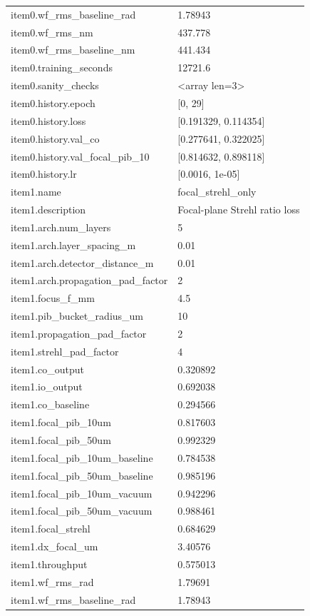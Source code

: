\begin{longtable}{p{}p{}}
item0.wf\_rms\_baseline\_rad & 1.78943\\
item0.wf\_rms\_nm & 437.778\\
item0.wf\_rms\_baseline\_nm & 441.434\\
item0.training\_seconds & 12721.6\\
item0.sanity\_checks & <array len=3>\\
item0.history.epoch & [0, 29]\\
item0.history.loss & [0.191329, 0.114354]\\
item0.history.val\_co & [0.277641, 0.322025]\\
item0.history.val\_focal\_pib\_10 & [0.814632, 0.898118]\\
item0.history.lr & [0.0016, 1e-05]\\
item1.name & focal\_strehl\_only\\
item1.description & Focal-plane Strehl ratio loss\\
item1.arch.num\_layers & 5\\
item1.arch.layer\_spacing\_m & 0.01\\
item1.arch.detector\_distance\_m & 0.01\\
item1.arch.propagation\_pad\_factor & 2\\
item1.focus\_f\_mm & 4.5\\
item1.pib\_bucket\_radius\_um & 10\\
item1.propagation\_pad\_factor & 2\\
item1.strehl\_pad\_factor & 4\\
item1.co\_output & 0.320892\\
item1.io\_output & 0.692038\\
item1.co\_baseline & 0.294566\\
item1.focal\_pib\_10um & 0.817603\\
item1.focal\_pib\_50um & 0.992329\\
item1.focal\_pib\_10um\_baseline & 0.784538\\
item1.focal\_pib\_50um\_baseline & 0.985196\\
item1.focal\_pib\_10um\_vacuum & 0.942296\\
item1.focal\_pib\_50um\_vacuum & 0.988461\\
item1.focal\_strehl & 0.684629\\
item1.dx\_focal\_um & 3.40576\\
item1.throughput & 0.575013\\
item1.wf\_rms\_rad & 1.79691\\
item1.wf\_rms\_baseline\_rad & 1.78943\\

\end{longtable}
